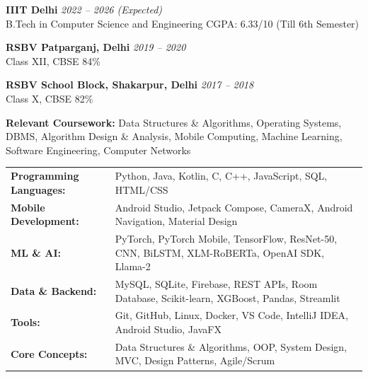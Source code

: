 \documentclass[10pt]{extarticle}
\begin{document}
\cvheader


\begin{contained}
\vspace{5pt}

\textbf{IIIT Delhi} \hfill \textit{2022 -- 2026 (Expected)}\\
B.Tech in Computer Science and Engineering \hfill CGPA: 6.33/10 (Till 6th Semester)

\vspace{6pt}

\textbf{RSBV Patparganj, Delhi} \hfill \textit{2019 -- 2020}\\
Class XII, CBSE \hfill 84\%

\vspace{6pt}

\textbf{RSBV School Block, Shakarpur, Delhi} \hfill \textit{2017 -- 2018}\\
Class X, CBSE \hfill 82\%

\vspace{6pt}

\textbf{Relevant Coursework:} Data Structures \& Algorithms, Operating Systems, DBMS, Algorithm Design \& Analysis, Mobile Computing, Machine Learning, Software Engineering, Computer Networks
\end{contained}

\vspace{8pt}

\begin{contained}
\vspace{5pt}

\begin{tabular}{@{}p{}p{}@{}}
    \textbf{Programming Languages:} & Python, Java, Kotlin, C, C++, JavaScript, SQL, HTML/CSS \\[6pt]
    \textbf{Mobile Development:} & Android Studio, Jetpack Compose, CameraX, Android Navigation, Material Design \\[6pt]
    \textbf{ML \& AI:} & PyTorch, PyTorch Mobile, TensorFlow, ResNet-50, CNN, BiLSTM, XLM-RoBERTa, OpenAI SDK, Llama-2 \\[6pt]
    \textbf{Data \& Backend:} & MySQL, SQLite, Firebase, REST APIs, Room Database, Scikit-learn, XGBoost, Pandas, Streamlit \\[6pt]
    \textbf{Tools:} & Git, GitHub, Linux, Docker, VS Code, IntelliJ IDEA, Android Studio, JavaFX \\[6pt]
    \textbf{Core Concepts:} & Data Structures \& Algorithms, OOP, System Design, MVC, Design Patterns, Agile/Scrum \\
\end{tabular}
\end{contained}
\end{document}
